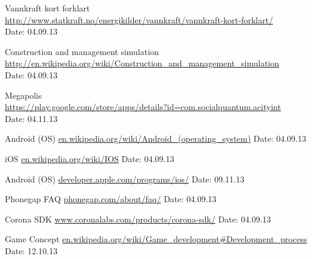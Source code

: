 \begin{thebibliography}{99}
	Vannkraft kort forklart \\
	\href {http://www.statkraft.no/energikilder/vannkraft/vannkraft-kort-forklart/}{http://www.statkraft.no/energikilder/vannkraft/vannkraft-kort-forklart/} \\
	Date: 04.09.13

	Construction and management simulation \\
	\href {http://en.wikipedia.org/wiki/Construction_and_management_simulation}{http://en.wikipedia.org/wiki/Construction\_and\_management\_simulation} \\
	Date: 04.09.13

	Megapolis \\
	\href {https://play.google.com/store/apps/details?id=com.socialquantum.acityint}{https://play.google.com/store/apps/details?id=com.socialquantum.acityint} \\
	Date: 04.11.13

	Android (OS)\newline
	\href {http://en.wikipedia.org/wiki/Android\_(operating_system)}{en.wikipedia.org/wiki/Android\_(operating\_system)}\newline
	Date: 04.09.13

	iOS\newline
	\href {http://en.wikipedia.org/wiki/IOS}{en.wikipedia.org/wiki/IOS}\newline
	Date: 04.09.13

	Android (OS)\newline
	\href {https://developer.apple.com/programs/ios/}{developer.apple.com/programs/ios/}\newline
	Date: 09.11.13

	Phonegap FAQ\newline
	\href {http://phonegap.com/about/faq/}{phonegap.com/about/faq/}\newline
	Date: 04.09.13

	Corona SDK\newline
	\href {http://www.coronalabs.com/products/corona-sdk/}{www.coronalabs.com/products/corona-sdk/}\newline
	Date: 04.09.13

	Game Concept\newline
	\href {en.wikipedia.org/wiki/Game\_development#Development\_process}{en.wikipedia.org/wiki/Game\_development\#Development\_process}\newline
	Date: 12.10.13


\end{thebibliography}
